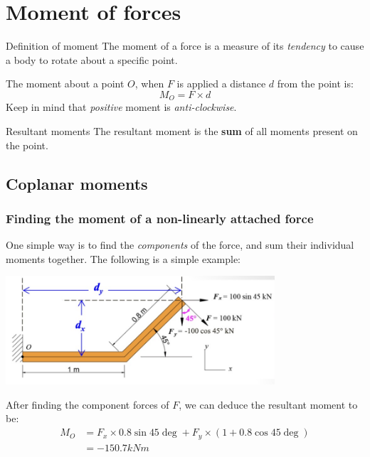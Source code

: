 \documentclass{article}
\begin{document}
\section{Moment of forces}
\begin{definition}
  {Definition of moment}
  The moment of a force is a measure of its \emph{tendency} to cause a body to rotate about a specific point.

  The moment about a point $O$, when $F$ is applied a distance $d$ from the point is: 
  \[M_O=F\times d\]
  Keep in mind that \emph{positive} moment is \emph{anti-clockwise}.
\end{definition}
\begin{knBox}
  {Resultant moments}
  The resultant moment is the \textbf{sum} of all moments present on the point.
\end{knBox}
\subsection{Coplanar moments}
\subsubsection{Finding the moment of a non-linearly attached force}
One simple way is to find the \emph{components} of the force, and sum their individual moments together. The following is a simple example:
\begin{center}
  \includegraphics[width=10cm]{img/Moment1.jpg}
  
  After finding the component forces of $F$, we can deduce the resultant moment to be:
  \begin{align*}
    M_O&=F_x\times 0.8\sin 45\deg+F_y\times(1+0.8\cos 45\deg)\\
    &=-150.7kNm
  \end{align*}
\end{center}
\end{document}
